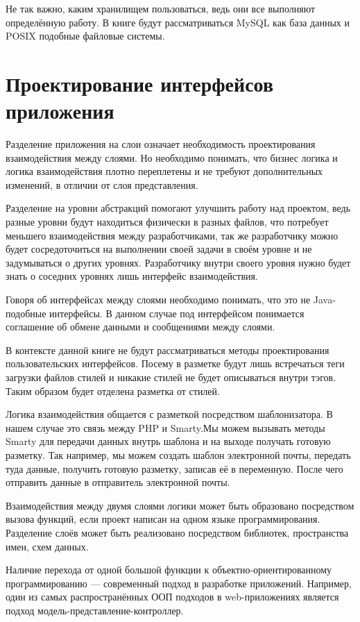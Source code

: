 Не так важно, каким хранилищем пользоваться, ведь они все выполняют определённую работу. В книге будут рассматриваться MySQL как база данных и POSIX подобные файловые системы.

\section{ Проектирование интерфейсов приложения } \label{sect1_3}

Разделение приложения на слои означает необходимость проектирования взаимодействия между слоями. Но необходимо понимать, что бизнес логика и логика взаимодействия плотно переплетены и не требуют дополнительных изменений, в отличии от слоя представления.

Разделение на уровни абстракций помогают улучшить работу над проектом, ведь разные уровни будут находиться физически в разных файлов, что потребует меньшего взаимодействия между разработчиками, так же разработчику можно будет сосредоточиться на выполнении своей задачи в своём уровне и не задумываться о других уровнях. Разработчику внутри своего уровня нужно будет знать о соседних уровнях лишь интерфейс взаимодействия.

Говоря об интерфейсах между слоями необходимо понимать, что это не Java-подобные интерфейсы. В данном случае под интерфейсом понимается соглашение об обмене данными и сообщениями между слоями.

В контексте данной книге не будут рассматриваться методы проектирования пользовательских интерфейсов. Посему в разметке будут лишь встречаться теги загрузки файлов стилей и никакие стилей не будет описываться внутри тэгов. Таким образом будет отделена разметка от стилей.

Логика взаимодействия общается с разметкой посредством шаблонизатора. В  нашем случае это связь между PHP и Smarty.Мы можем вызывать методы Smarty для передачи данных внутрь шаблона и на выходе получать готовую разметку. Так например, мы можем создать шаблон электронной почты, передать туда данные, получить готовую разметку, записав её в переменную. После чего отправить данные в отправитель электронной почты.

Взаимодействия между двумя слоями логики может быть образовано посредством вызова функций, если проект написан на одном языке программирования. Разделение слоёв может быть реализовано посредством библиотек, пространства имен, схем данных. 

Наличие перехода от одной большой функции к объектно-ориентированному программированию --- современный подход в разработке приложений. Например, один из самых распространённых ООП подходов в web-приложениях является подход модель-представление-контроллер.

